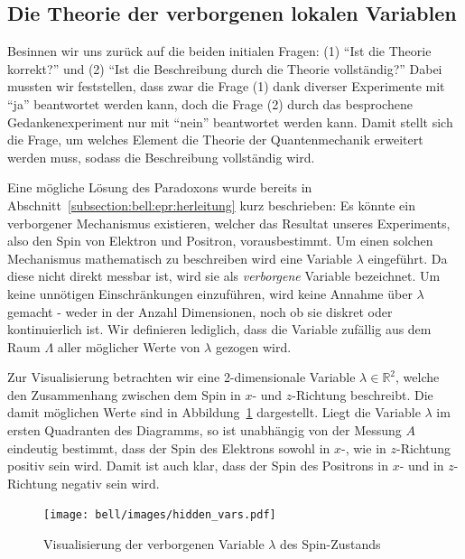 \begin{refsection}
\subsection{Die Theorie der verborgenen lokalen Variablen\label{subsection:bell:epr:hiddenvars}}
Besinnen wir uns zur\"uck auf die beiden initialen Fragen: 
(1) \enquote{Ist die Theorie korrekt?} und 
(2) \enquote{Ist die Beschreibung durch die Theorie vollst\"andig?}
Dabei mussten wir feststellen, dass zwar die Frage (1) dank diverser
Experimente mit \enquote{ja} beantwortet werden kann, doch die Frage (2) 
durch das besprochene Gedankenexperiment nur mit \enquote{nein} beantwortet
werden kann. 
Damit stellt sich die Frage, um welches Element die Theorie der Quantenmechanik
erweitert werden muss, sodass die Beschreibung vollst\"andig wird.

Eine m\"ogliche L\"osung des Paradoxons wurde bereits in
Abschnitt~\ref{subsection:bell:epr:herleitung} kurz beschrieben:
Es k\"onnte ein verborgener Mechanismus existieren, welcher das Resultat unseres
Experiments, also den Spin von Elektron und Positron, vorausbestimmt.
Um einen solchen Mechanismus mathematisch zu beschreiben wird eine Variable
$\lambda$ eingef\"uhrt.
Da diese nicht direkt messbar ist, wird sie als \emph{verborgene} Variable
bezeichnet.
Um keine unn\"otigen Einschr\"ankungen einzuf\"uhren, wird keine Annahme
\"uber $\lambda$ gemacht - weder in der Anzahl Dimensionen, noch ob sie diskret
oder kontinuierlich ist.
Wir definieren lediglich, dass die Variable zuf\"allig aus dem Raum $\Lambda$ 
aller m\"oglicher Werte von $\lambda$ gezogen wird.

Zur Visualisierung betrachten wir eine 2-dimensionale Variable 
$\lambda\in\mathbb{R}^2$, welche den Zusammenhang zwischen dem Spin in $x$- 
und $z$-Richtung beschreibt.
Die damit m\"oglichen Werte sind in Abbildung~\ref{fig:bell:hidden_var}
dargestellt.
Liegt die Variable $\lambda$ im ersten Quadranten des Diagramms, so ist 
unabh\"angig von der Messung $A$ eindeutig bestimmt, dass der Spin des Elektrons
sowohl in $x$-, wie in $z$-Richtung positiv sein wird.
Damit ist auch klar, dass der Spin des Positrons in $x$- und in $z$-Richtung
negativ sein wird.

\begin{figure}
    \centering
    \texttt{[image: bell/images/hidden\_vars.pdf]}
    \caption{Visualisierung der verborgenen Variable $\lambda$ des Spin-Zustands}
    \label{fig:bell:hidden_var}
\end{figure}


\end{refsection}
